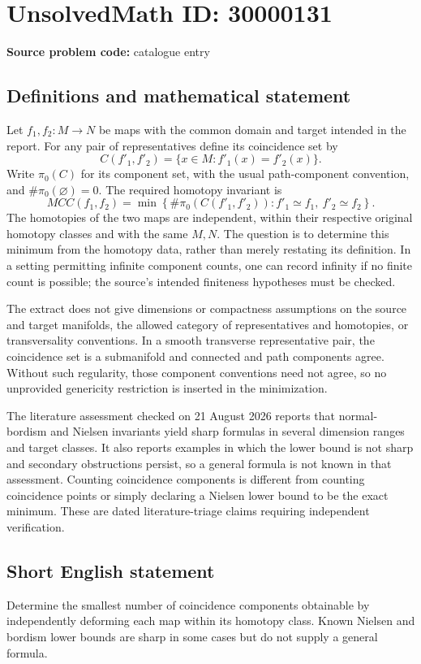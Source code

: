 \documentclass[11pt]{article}
\begin{document}
\section*{UnsolvedMath ID: 30000131}
\textbf{Source problem code:} catalogue entry
\subsection{Definitions and mathematical statement}
Let $f_1,f_2:M\to N$ be maps with the common domain and target intended in the report. For any pair of representatives define its coincidence set by
\[
 C(f'_1,f'_2)=\{x\in M:f'_1(x)=f'_2(x)\}.
\]
Write $\pi_0(C)$ for its component set, with the usual path-component convention, and $\#\pi_0(\varnothing)=0$. The required homotopy invariant is
\[
 M\!CC(f_1,f_2)=
 \min\left\{\#\pi_0(C(f'_1,f'_2)):
            f'_1\simeq f_1,\ f'_2\simeq f_2\right\}.
\]
The homotopies of the two maps are independent, within their respective original homotopy classes and with the same $M,N$. The question is to determine this minimum from the homotopy data, rather than merely restating its definition. In a setting permitting infinite component counts, one can record infinity if no finite count is possible; the source's intended finiteness hypotheses must be checked.

The extract does not give dimensions or compactness assumptions on the source and target manifolds, the allowed category of representatives and homotopies, or transversality conventions. In a smooth transverse representative pair, the coincidence set is a submanifold and connected and path components agree. Without such regularity, those component conventions need not agree, so no unprovided genericity restriction is inserted in the minimization.

The literature assessment checked on 21 August 2026 reports that normal-bordism and Nielsen invariants yield sharp formulas in several dimension ranges and target classes. It also reports examples in which the lower bound is not sharp and secondary obstructions persist, so a general formula is not known in that assessment. Counting coincidence components is different from counting coincidence points or simply declaring a Nielsen lower bound to be the exact minimum. These are dated literature-triage claims requiring independent verification.
\subsection{Short English statement}
Determine the smallest number of coincidence components obtainable by independently deforming each map within its homotopy class. Known Nielsen and bordism lower bounds are sharp in some cases but do not supply a general formula.
\end{document}
